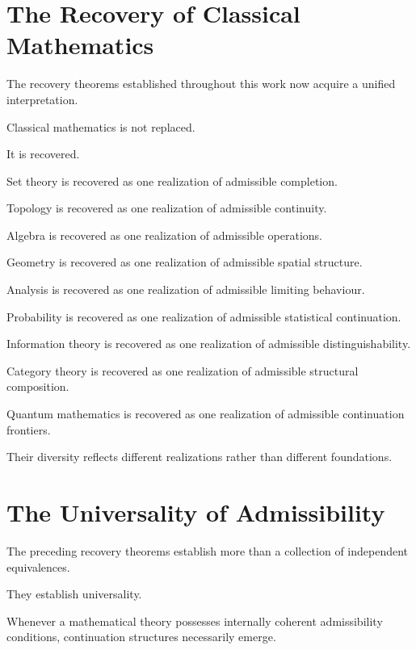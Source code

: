 \documentclass[13pt,openany]{book}
\theoremstyle{plain}
\theoremstyle{definition}
\begin{document}
\section{The Recovery of Classical Mathematics}

The recovery theorems established throughout this work now acquire a unified
interpretation.

Classical mathematics is not replaced.

It is recovered.

Set theory is recovered as one realization of admissible completion.

Topology is recovered as one realization of admissible continuity.

Algebra is recovered as one realization of admissible operations.

Geometry is recovered as one realization of admissible spatial structure.

Analysis is recovered as one realization of admissible limiting behaviour.

Probability is recovered as one realization of admissible statistical
continuation.

Information theory is recovered as one realization of admissible
distinguishability.

Category theory is recovered as one realization of admissible structural
composition.

Quantum mathematics is recovered as one realization of admissible continuation
frontiers.

Their diversity reflects different realizations rather than different
foundations.

\section{The Universality of Admissibility}

The preceding recovery theorems establish more than a collection of independent
equivalences.

They establish universality.

Whenever a mathematical theory possesses internally coherent admissibility
conditions, continuation structures necessarily emerge.
\end{document}
